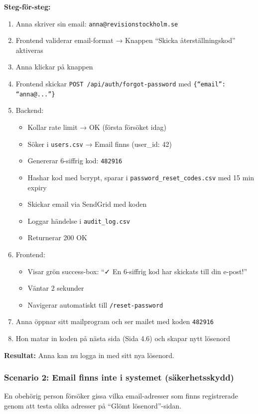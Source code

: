 \documentclass[12pt,a4paper]{article}
\begin{document}
\textbf{Steg-för-steg:}
\begin{enumerate}[noitemsep]
  \item Anna skriver sin email: \texttt{anna@revisionstockholm.se}
  \item Frontend validerar email-format → Knappen ``Skicka återställningskod'' aktiveras
  \item Anna klickar på knappen
  \item Frontend skickar \texttt{POST /api/auth/forgot-password} med \texttt{\{``email'': ``anna@...''\}}
  \item Backend:
  \begin{itemize}[noitemsep]
    \item Kollar rate limit → OK (första försöket idag)
    \item Söker i \texttt{users.csv} → Email finns (user\_id: 42)
    \item Genererar 6-siffrig kod: \texttt{482916}
    \item Hashar kod med bcrypt, sparar i \texttt{password\_reset\_codes.csv} med 15 min expiry
    \item Skickar email via SendGrid med koden
    \item Loggar händelse i \texttt{audit\_log.csv}
    \item Returnerar 200 OK
  \end{itemize}
  \item Frontend:
  \begin{itemize}[noitemsep]
    \item Visar grön success-box: ``✓ En 6-siffrig kod har skickats till din e-post!''
    \item Väntar 2 sekunder
    \item Navigerar automatiskt till \texttt{/reset-password}
  \end{itemize}
  \item Anna öppnar sitt mailprogram och ser mailet med koden \texttt{482916}
  \item Hon matar in koden på nästa sida (Sida 4.6) och skapar nytt lösenord
\end{enumerate}

\textbf{Resultat:} Anna kan nu logga in med sitt nya lösenord.

\subsubsection{Scenario 2: Email finns inte i systemet (säkerhetsskydd)}

En obehörig person försöker gissa vilka email-adresser som finns registrerade genom att testa olika adresser på ``Glömt lösenord''-sidan.
\end{document}
